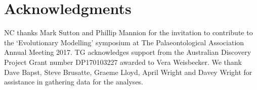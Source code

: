 \documentclass[12pt,a4paper]{article}
\begin{document}
\section{Acknowledgments}
	NC thanks Mark Sutton and Phillip Mannion for the invitation to contribute to the `Evolutionary Modelling' symposium at The Palaeontological Association Annual Meeting 2017.
  TG acknowledges support from the Australian Discovery Project Grant number DP170103227 awarded to Vera Weisbecker.
  We thank Dave Bapst, Steve Brusatte, Graeme Lloyd, April Wright and Davey Wright for assistance in gathering data for the analyses.
	
 
 
\end{document}
